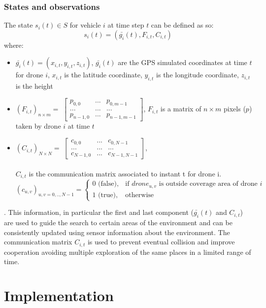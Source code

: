 \documentclass[LaM,binding=0.6cm]{sapthesis}
\begin{document}
\subsection*{States and observations}
The state $s_i(t) \in S$ for vehicle $i$ at time step $t$ can be defined as so:
$$ s_i(t) = (\bar{g_{i}}(t),F_{i,t},C_{i,t})$$
where:
\begin{itemize}
	\item $\bar{g_{i}}(t) = (x_{i,t},y_{i,t},z_{i,t})$, $\bar{g_{i}}(t)$ are the GPS simulated coordinates at time $t$ for drone $i$, $x_{i,t}$ is the latitude coordinate, $y_{i,t}$ is the longitude coordinate, $z_{i,t}$ is the height
	
	\item $(F_{i,t})_{n\times m} = $ 
	$\begin{bmatrix}
	p_{0,0} & ... & p_{0,m-1} \\ ... & ... & ... \\ p_{n-1,0} & ... & p_{n-1,m-1} 
	\end{bmatrix}
	$, $F_{i,t} $ is a matrix of $n\times m$ pixels ($p$) taken by drone $i$ at time $t$
	
	\item $(C_{i,t})_{N\times N} = $ 
	$\begin{bmatrix}
	c_{0,0} & ... & c_{0,N-1} \\ ... & ... & ... \\ c_{N-1,0} & ... & c_{N-1,N-1} 
	\end{bmatrix}
	$,\\ \\
	$C_{i,t} $ is the communication matrix associated to instant t for drone i.\\
	$(c_{u,v})_{u,v=0,..,N-1} = \begin{cases} 0 \mbox{ (false)}, & \mbox{if } drone_{u,v} \mbox{ is outside coverage area of drone }i \\ 1 \mbox{ (true)}, & \mbox{otherwise}
	\end{cases}$
\end{itemize}. 
This information, in particular the first and last component ($\bar{g_i}(t)$ and $C_{i,t}$) are used to guide the search to certain areas of the
environment and can be consistently updated using sensor information about the environment. The communication matrix $C_{i,t}$ is used to prevent eventual collision and improve cooperation avoiding multiple exploration of the same places in a limited range of time.



\chapter{Implementation}
\end{document}
